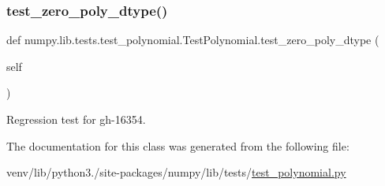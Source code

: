 \mbox{\label{classnumpy_1_1lib_1_1tests_1_1test__polynomial_1_1TestPolynomial_aecb0a9c8fa33f0c4e685498fdd723fc1}} 
\subsubsection{\texorpdfstring{test\+\_\+zero\+\_\+poly\+\_\+dtype()}{test\_zero\_poly\_dtype()}}
{\footnotesize\ttfamily def numpy.\+lib.\+tests.\+test\+\_\+polynomial.\+Test\+Polynomial.\+test\+\_\+zero\+\_\+poly\+\_\+dtype (\begin{DoxyParamCaption}\item[{}]{self }\end{DoxyParamCaption})}

\begin{DoxyVerb}Regression test for gh-16354.
\end{DoxyVerb}
 

The documentation for this class was generated from the following file\+:\begin{DoxyCompactItemize}
\item 
venv/lib/python3./site-\/packages/numpy/lib/tests/\hyperlink{lib_2tests_2test__polynomial_8py}{test\+\_\+polynomial.\+py}\end{DoxyCompactItemize}
